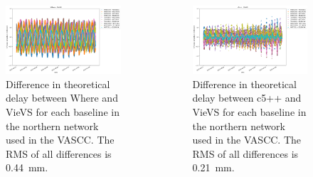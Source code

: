\documentclass{beamer}
\begin{document}
\begin{frame}[t]
\begin{columns}
    \begin{column}[t]{.24\textwidth}
      \begin{figure}
        \includegraphics[width=\textwidth]{figure/where_vs_vievs_NH}
        \caption{Difference in theoretical delay between Where and VieVS for each
          baseline in the northern network used in the VASCC. The RMS of all
          differences is 0.44~mm.}
        \label{fig:where_vievs_sh}
      \end{figure}
    \end{column}

    \begin{column}[t]{.24\textwidth}
      \begin{figure}
        \includegraphics[width=\textwidth]{figure/c5++_vs_vievs_NH}
        \caption{Difference in theoretical delay between c5++ and VieVS for each
          baseline in the northern network used in the VASCC. The RMS of all
          differences is 0.21~mm.}
        \label{fig:c5++_vievs_sh}
      \end{figure}
    \end{column}
  \end{columns}


\end{frame}
\end{document}
